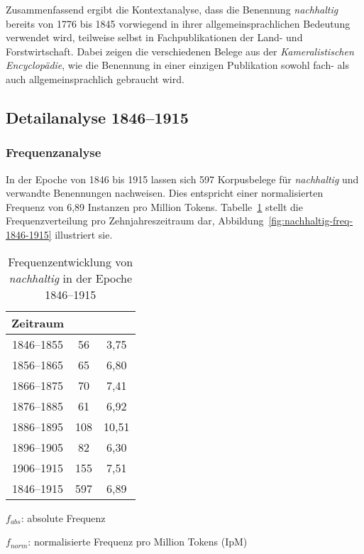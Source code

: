 \documentclass[
    german,
    a4paper,%
    12pt,%
    oneside,%
    toc=bibliography,
    final,
]{scrartcl}
\begin{document}
Zusammenfassend ergibt die Kontextanalyse, dass die Benennung \textit{nachhaltig} bereits von 1776 bis 1845 vorwiegend in ihrer allgemeinsprachlichen Bedeutung verwendet wird, teilweise selbst in Fachpublikationen der Land- und Forstwirtschaft. Dabei zeigen die verschiedenen Belege aus der \textit{Kameralistischen Encyclopädie}, wie die Benennung in einer einzigen Publikation sowohl fach- als auch allgemeinsprachlich gebraucht wird.



\subsection{Detailanalyse 1846–1915}
\label{subsec:detail-1846–1915}

\subsubsection{Frequenzanalyse}

In der Epoche von 1846 bis 1915 lassen sich 597 Korpusbelege für \textit{nachhaltig} und verwandte Benennungen nachweisen. Dies entspricht einer normalisierten Frequenz von 6,89 Instanzen pro Million Tokens. Tabelle~\ref{tab:freq-epoche2} stellt die Frequenzverteilung pro Zehnjahreszeitraum dar, Abbildung~\ref{fig:nachhaltig-freq-1846-1915} illustriert sie.

\begin{table}[h!]
	\centering
	\renewcommand{\arraystretch}{1.5}
	
	\caption{Frequenzentwicklung von \textit{nachhaltig} in der Epoche 1846–1915}
	\label{tab:freq-epoche2}
	
	\begin{threeparttable}
	
	\begin{tabular}{ccc}
	\textbf{Zeitraum} & \boldmath{$f_{abs}$} & \boldmath{$f_{norm}$} \\ \hline
	1846–1855 & 56 & 3,75 \\ \hline
	1856–1865 & 65 & 6,80 \\ \hline
	1866–1875 & 70 & 7,41 \\ \hline
	1876–1885 & 61 & 6,92 \\ \hline
	1886–1895 & 108 & 10,51 \\ \hline
	1896–1905 & 82 & 6,30 \\ \hline
	1906–1915 & 155 & 7,51 \\ \hline\hline
	1846–1915 & 597 & 6,89 \\ \hline
	\end{tabular} 
	
	\begin{tablenotes}
	\footnotesize
	\setlength{\itemindent}{-1.2em}
	\item $f_{abs}$: absolute Frequenz
	\item $f_{norm}$: normalisierte Frequenz pro Million Tokens (IpM)
	\end{tablenotes}
	
	\end{threeparttable}
\end{table}
\end{document}
